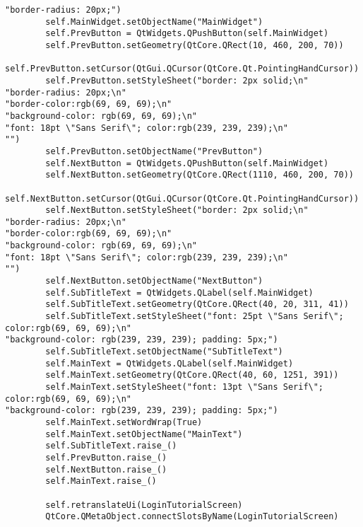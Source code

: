 \documentclass{article}
\begin{document}
\begin{lstlisting}
"border-radius: 20px;")
        self.MainWidget.setObjectName("MainWidget")
        self.PrevButton = QtWidgets.QPushButton(self.MainWidget)
        self.PrevButton.setGeometry(QtCore.QRect(10, 460, 200, 70))
        self.PrevButton.setCursor(QtGui.QCursor(QtCore.Qt.PointingHandCursor))
        self.PrevButton.setStyleSheet("border: 2px solid;\n"
"border-radius: 20px;\n"
"border-color:rgb(69, 69, 69);\n"
"background-color: rgb(69, 69, 69);\n"
"font: 18pt \"Sans Serif\"; color:rgb(239, 239, 239);\n"
"")
        self.PrevButton.setObjectName("PrevButton")
        self.NextButton = QtWidgets.QPushButton(self.MainWidget)
        self.NextButton.setGeometry(QtCore.QRect(1110, 460, 200, 70))
        self.NextButton.setCursor(QtGui.QCursor(QtCore.Qt.PointingHandCursor))
        self.NextButton.setStyleSheet("border: 2px solid;\n"
"border-radius: 20px;\n"
"border-color:rgb(69, 69, 69);\n"
"background-color: rgb(69, 69, 69);\n"
"font: 18pt \"Sans Serif\"; color:rgb(239, 239, 239);\n"
"")
        self.NextButton.setObjectName("NextButton")
        self.SubTitleText = QtWidgets.QLabel(self.MainWidget)
        self.SubTitleText.setGeometry(QtCore.QRect(40, 20, 311, 41))
        self.SubTitleText.setStyleSheet("font: 25pt \"Sans Serif\"; color:rgb(69, 69, 69);\n"
"background-color: rgb(239, 239, 239); padding: 5px;")
        self.SubTitleText.setObjectName("SubTitleText")
        self.MainText = QtWidgets.QLabel(self.MainWidget)
        self.MainText.setGeometry(QtCore.QRect(40, 60, 1251, 391))
        self.MainText.setStyleSheet("font: 13pt \"Sans Serif\"; color:rgb(69, 69, 69);\n"
"background-color: rgb(239, 239, 239); padding: 5px;")
        self.MainText.setWordWrap(True)
        self.MainText.setObjectName("MainText")
        self.SubTitleText.raise_()
        self.PrevButton.raise_()
        self.NextButton.raise_()
        self.MainText.raise_()

        self.retranslateUi(LoginTutorialScreen)
        QtCore.QMetaObject.connectSlotsByName(LoginTutorialScreen)


\end{lstlisting}
\end{document}
